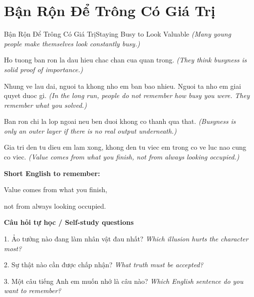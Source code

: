 \section{Bận Rộn Để Trông Có Giá Trị}
\begin{truyen}{Bận Rộn Để Trông Có Giá Trị}{Staying Busy to Look Valuable}
\textit{(Many young people make themselves look constantly busy.)}

Ho tuong ban ron la dau hieu chac chan cua quan trong.
\textit{(They think busyness is solid proof of importance.)}

Nhung ve lau dai, nguoi ta khong nho em ban bao nhieu. Nguoi ta nho em giai quyet duoc gi.
\textit{(In the long run, people do not remember how busy you were. They remember what you solved.)}

Ban ron chi la lop ngoai neu ben duoi khong co thanh qua that.
\textit{(Busyness is only an outer layer if there is no real output underneath.)}

\end{truyen}

\begin{baihoc}
Gia tri den tu dieu em lam xong, khong den tu viec em trong co ve luc nao cung co viec.
\textit{(Value comes from what you finish, not from always looking occupied.)}
\end{baihoc}

\begin{ghinhoanh}
\textbf{Short English to remember:}

Value comes from what you finish,

not from always looking occupied.

\end{ghinhoanh}

\begin{tuhocnhanh}
\textbf{Câu hỏi tự học / Self-study questions}

1. Ảo tưởng nào đang làm nhân vật đau nhất? \textit{Which illusion hurts the character most?}

2. Sự thật nào cần được chấp nhận? \textit{What truth must be accepted?}

3. Một câu tiếng Anh em muốn nhớ là câu nào? \textit{Which English sentence do you want to remember?}
\end{tuhocnhanh}
\ngancach

